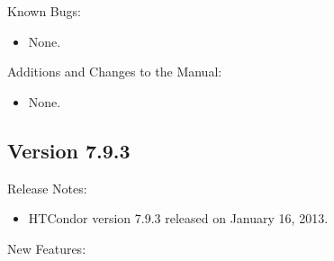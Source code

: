 \noindent Known Bugs:

\begin{itemize}

\item None.

\end{itemize}

\noindent Additions and Changes to the Manual:

\begin{itemize}

\item None.

\end{itemize}

\subsection*{\label{sec:New-7-9-3}Version 7.9.3}

\noindent Release Notes:

\begin{itemize}

\item HTCondor version 7.9.3 released on January 16, 2013.

\end{itemize}


\noindent New Features:

